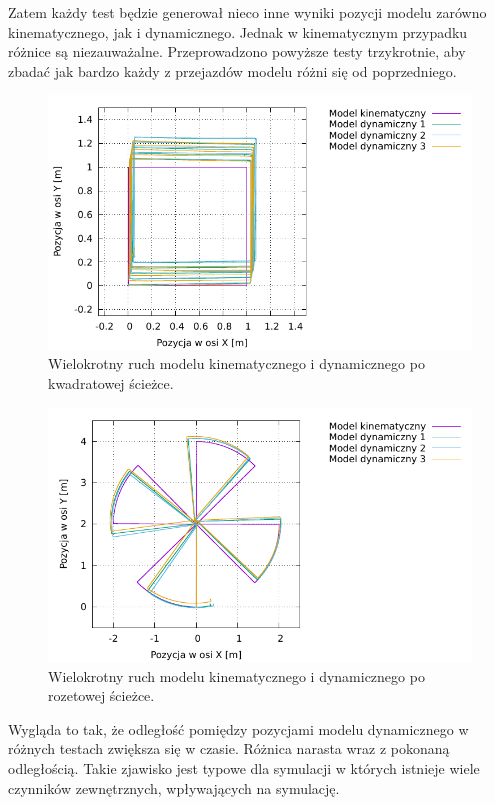 		Zatem każdy test będzie generował nieco inne wyniki pozycji modelu zarówno kinematycznego, jak i dynamicznego. 
		Jednak w kinematycznym przypadku różnice są niezauważalne.
		Przeprowadzono powyższe testy trzykrotnie, aby zbadać jak bardzo każdy z przejazdów modelu różni się od poprzedniego.
		
		\begin{figure}[H]
			\centering
			\includegraphics[width=\textwidth]{plots/square_3.pdf}
				\caption{Wielokrotny ruch modelu kinematycznego i dynamicznego po kwadratowej ścieżce.}
			\label{plot:gramofon_square_3}
		\end{figure}
		
		\begin{figure}[H]
			\centering
			\includegraphics[width=\textwidth]{plots/sun_3.pdf}
				\caption{Wielokrotny ruch modelu kinematycznego i dynamicznego po rozetowej ścieżce.}
			\label{plot:gramofon_sun_3}
		\end{figure}
		
		Wygląda to tak, że odległość pomiędzy pozycjami modelu dynamicznego w różnych testach zwiększa się w czasie.
		Różnica narasta wraz z pokonaną odległością.
		Takie zjawisko jest typowe dla symulacji w których istnieje wiele czynników zewnętrznych, wpływających na symulację.
		
